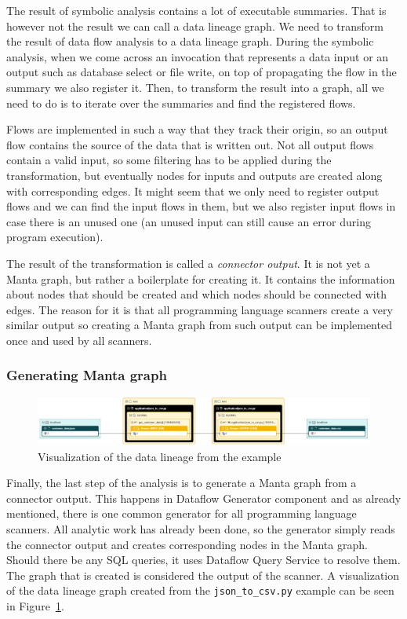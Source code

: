 The result of symbolic analysis contains a lot of executable summaries. That is however not the result we can call a data lineage graph. We need to transform the result of data flow analysis to a data lineage graph. During the symbolic analysis, when we come across an invocation that represents a data input or an output such as database select or file write, on top of propagating the flow in the summary we also register it. Then, to transform the result into a graph, all we need to do is to iterate over the summaries and find the registered flows.
\par
Flows are implemented in such a way that they track their origin, so an output flow contains the source of the data that is written out. Not all output flows contain a valid input, so some filtering has to be applied during the transformation, but eventually nodes for inputs and outputs are created along with corresponding edges. It might seem that we only need to register output flows and we can find the input flows in them, but we also register input flows in case there is an unused one (an unused input can still cause an error during program execution).
\par
The result of the transformation is called a \textit{connector output}. It is not yet a Manta graph, but rather a boilerplate for creating it. It contains the information about nodes that should be created and which nodes should be connected with edges. The reason for it is that all programming language scanners create a very similar output so creating a Manta graph from such output can be implemented once and used by all scanners.

\subsubsection{Generating Manta graph}

\begin{figure}[ht]\centering
\includegraphics[width=1.0\textwidth]{img/json_to_csv.PNG}
\caption{Visualization of the data lineage from the example}
\label{fig:lineage}
\end{figure}  

Finally, the last step of the analysis is to generate a Manta graph from a connector output. This happens in Dataflow Generator component and as already mentioned, there is one common generator for all programming language scanners. All analytic work has already been done, so the generator simply reads the connector output and creates corresponding nodes in the Manta graph. Should there be any SQL queries, it uses Dataflow Query Service to resolve them. The graph that is created is considered the output of the scanner. A visualization of the data lineage graph created from the \texttt{json\_to\_csv.py} example can be seen in Figure~\ref{fig:lineage}.